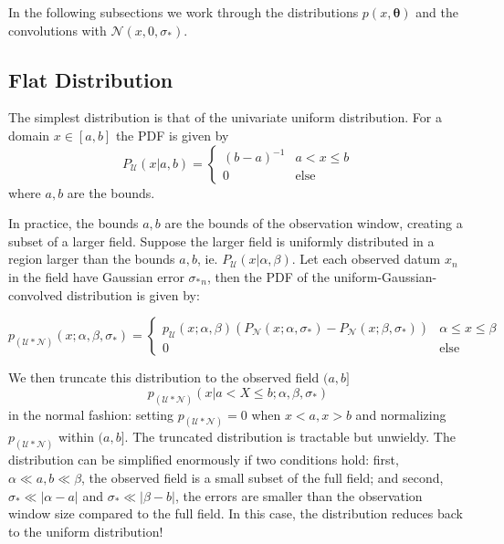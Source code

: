 \documentclass[twocolumn]{aastex631}
\newcommand{\mbs}[1]{\boldsymbol{#1}}
\newcommand{\mcal}[1]{\mathcal{#1}}
\newcommand{\pdf}{p}
\newcommand{\cdf}{P}
\newcommand{\sigobs}{{\sigma_*}}
\begin{document}
    In the following subsections we work through the distributions
    $\pdf(x,\mbs{\theta})$ and the convolutions with $\mcal{N}(x,0,\sigobs)$.

    \vspace{5pt}
    \subsection{Flat Distribution} \label{sub:flat_distribution}

        The simplest distribution is that of the univariate uniform
        distribution.  For a domain $x \in [a, b]$ the PDF is given by
        \begin{equation} \label{eq:pdf_flat_univariate}
            P_{\mcal{U}}(x|a,b) = \begin{cases}
                (b-a)^{-1} & a < x \leq b \\
                0 & \text{else}
            \end{cases}
        \end{equation}
        where $a,b$ are the bounds.

        In practice, the bounds $a,b$ are the bounds of the observation window,
        creating a subset of a larger field.  Suppose the larger field is
        uniformly distributed in a region larger than the bounds $a, b$, ie.
        $P_{\mcal{U}}(x|\alpha,\beta)$.  Let each observed datum $x_n$ in the
        field have Gaussian error $\sigobs_n$, then the PDF of the
        uniform-Gaussian-convolved distribution is given by:

        \begin{equation} \label{eq:flat_distribution}
            \pdf_{(\mcal{U}*\mcal{N})}(x; \alpha, \beta, \sigobs) = \begin{cases}
                \pdf_\mcal{U}(x; \alpha, \beta) \left( \cdf_{\mcal{N}}(x; \alpha, \sigobs) - \cdf_{\mcal{N}}(x; \beta, \sigobs) \right) & \alpha \leq x \leq \beta \\
                0 & \text{else}
            \end{cases}
        \end{equation}

        We then truncate this distribution to the observed field $(a, b]$
        \begin{equation} \label{eq:pdf_flat_univariate_convolved_error_full}
            \pdf_{(\mcal{U}*\mcal{N})}(x | a < X \leq b; \alpha, \beta, \sigobs)
        \end{equation}
        in the normal fashion: setting $\pdf_{(\mcal{U}*\mcal{N})} = 0$ when $x
        < a, x > b$ and normalizing $\pdf_{(\mcal{U}*\mcal{N})}$ within $(a,b]$.
        The truncated distribution is tractable but unwieldy. The distribution
        can be simplified enormously if two conditions hold: first, $\alpha \ll
        a, b \ll \beta$, the observed field is a small subset of the full field;
        and second, $\sigobs \ll |\alpha - a|$ and $\sigobs \ll |\beta - b|$,
        the errors are smaller than the observation window size compared to the
        full field.  In this case, the distribution reduces back to the uniform
        distribution!
\end{document}
